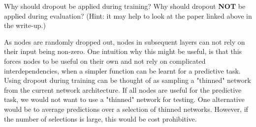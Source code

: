 \begin{parts}
\begin{subparts}
          \subpart[2] Why should dropout be applied during training? Why should dropout \textbf{NOT} be applied during evaluation? (Hint: it may help to look at the paper linked above in the write-up.) \newline
          \begin{shaded}
            \begin{answer}
                As nodes are randomly dropped out, nodes in subsequent layers can not rely on their input being non-zero.
                One intuition why this might be useful, is that this forces nodes to be useful on their own and not rely
                on complicated interdependencies, when a simpler function can be learnt for a predictive task. Using dropout
                during training can be thought of as sampling a "thinned" network from the current network architecture. If
                all nodes are useful for the predictive task, we would not want to use a "thinned" network for testing. One 
                alternative would be to average predictions over a selection of thinned networks. However, if the number of
                selections is large, this would be cost prohibitive.
            \end{answer}
        \end{shaded}
          
         
        \end{subparts}


\end{parts}
